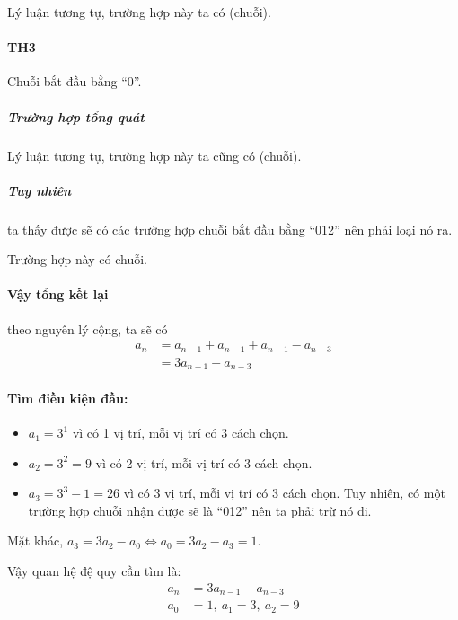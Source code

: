 \documentclass[main.tex]{subfiles}
\begin{document}
Lý luận tương tự, trường hợp này ta có  (chuỗi).\\

\paragraph{TH3} 
Chuỗi bắt đầu bằng ``0''.\\
\subparagraph{Trường hợp tổng quát}

Lý luận tương tự, trường hợp này ta cũng có  (chuỗi).

\subparagraph{Tuy nhiên} ta thấy được sẽ có các trường hợp chuỗi bắt đầu bằng ``012'' nên phải loại nó ra.
Trường hợp này có  chuỗi.

\paragraph{Vậy tổng kết lại} theo nguyên lý cộng, ta sẽ có
\begin{align*}
a_n &= a_{n-1} + a_{n-1} + a_{n-1} - a_{n-3}\\
&= 3a_{n-1} - a_{n-3}
\end{align*}

\paragraph*{Tìm điều kiện đầu:}
\begin{itemize}
    \item $a_1 = 3^1$ vì có 1 vị trí, mỗi vị trí có 3 cách chọn.
    \item $a_2 = 3^2 = 9$ vì có 2 vị trí, mỗi vị trí có 3 cách chọn.
    \item $a_3 = 3^3-1 = 26$ vì có 3 vị trí, mỗi vị trí có 3 cách chọn. Tuy nhiên, có một trường hợp chuỗi nhận được sẽ là ``012'' nên ta phải trừ nó đi.
\end{itemize}
Mặt khác, $a_3 = 3a_2 - a_0 \Leftrightarrow a_0 = 3a_2 - a_3 = 1$.

Vậy quan hệ đệ quy cần tìm là:
\begin{align*}
a_n &= 3a_{n-1} - a_{n-3} \\
a_0 &= 1,\ a_1 = 3,\ a_2 = 9
\end{align*}
\end{document}
